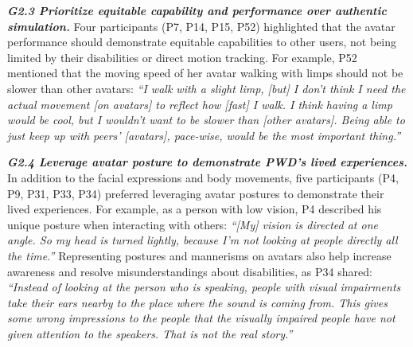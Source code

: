 \textbf{\textit{G2.3 Prioritize equitable capability and performance over authentic simulation.}}
Four participants (P7, P14, P15, P52) highlighted that the avatar performance should demonstrate equitable capabilities to other users, not being limited by their disabilities or direct motion tracking. %
For example, P52 mentioned that the moving speed of her avatar walking with limps should not be slower than other avatars: \textit{``I walk with a slight limp, [but] I don't think I need the actual movement [on avatars] to reflect how [fast] I walk.  
I think having a limp would be cool, but I wouldn't want to be slower than [other avatars].  
Being able to just keep up with peers’ [avatars], pace-wise, would be the most important thing.''} 



\textbf{\textit{G2.4 Leverage avatar posture to demonstrate PWD's lived experiences.}}
In addition to the facial expressions and body movements, five participants (P4, P9, P31, P33, P34) preferred leveraging avatar postures to demonstrate their lived experiences. For example, as a person with low vision, P4 described his unique posture when interacting with others: \textit{``[My] vision is directed at one angle. So my head is turned lightly, because I'm not looking at people directly all the time.''} Representing postures and mannerisms on avatars also help increase awareness and resolve misunderstandings about disabilities, as P34 shared: \textit{``Instead of looking at the person who is speaking, people with visual impairments take their ears nearby to the place where the sound is coming from. This gives some wrong impressions to the people that the visually impaired people have not given attention to the speakers. That is not the real story.''}

